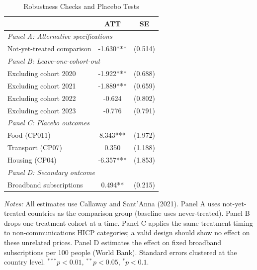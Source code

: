 \begin{table}[htbp]
\centering
\caption{Robustness Checks and Placebo Tests}
\label{tab:robustness}
\begin{tabular}{lcc}
\hline\hline
 & ATT & SE \\
\hline
\multicolumn{3}{l}{\textit{Panel A: Alternative specifications}} \\[3pt]
Not-yet-treated comparison & -1.630*** & (0.514) \\
[6pt]
\multicolumn{3}{l}{\textit{Panel B: Leave-one-cohort-out}} \\[3pt]
Excluding cohort 2020 & -1.922*** & (0.688) \\
Excluding cohort 2021 & -1.889*** & (0.659) \\
Excluding cohort 2022 & -0.624 & (0.802) \\
Excluding cohort 2023 & -0.776 & (0.791) \\
[6pt]
\multicolumn{3}{l}{\textit{Panel C: Placebo outcomes}} \\[3pt]
Food (CP011) & 8.343*** & (1.972) \\
Transport (CP07) & 0.350 & (1.188) \\
Housing (CP04) & -6.357*** & (1.853) \\
[6pt]
\multicolumn{3}{l}{\textit{Panel D: Secondary outcome}} \\[3pt]
Broadband subscriptions & 0.494** & (0.215) \\
\hline\hline
\end{tabular}
\begin{tablenotes}[flushleft]
\small
\item \textit{Notes:} All estimates use Callaway and Sant'Anna (2021). Panel A uses not-yet-treated countries as the comparison group (baseline uses never-treated). Panel B drops one treatment cohort at a time. Panel C applies the same treatment timing to non-communications HICP categories; a valid design should show no effect on these unrelated prices. Panel D estimates the effect on fixed broadband subscriptions per 100 people (World Bank). Standard errors clustered at the country level. $^{***}p<0.01$, $^{**}p<0.05$, $^{*}p<0.1$.
\end{tablenotes}
\end{table}
